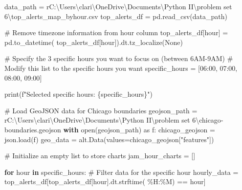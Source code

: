 \documentclass[
  letterpaper,
  DIV=11,
  numbers=noendperiod]{scrartcl}
\newenvironment{Shaded}{\begin{snugshade}}{\end{snugshade}}
\newcommand{\BuiltInTok}[1]{\textcolor[rgb]{0.00,0.23,0.31}{#1}}
\newcommand{\CommentTok}[1]{\textcolor[rgb]{0.37,0.37,0.37}{#1}}
\newcommand{\ControlFlowTok}[1]{\textcolor[rgb]{0.00,0.23,0.31}{\textbf{#1}}}
\newcommand{\ImportTok}[1]{\textcolor[rgb]{0.00,0.46,0.62}{#1}}
\newcommand{\KeywordTok}[1]{\textcolor[rgb]{0.00,0.23,0.31}{\textbf{#1}}}
\newcommand{\NormalTok}[1]{\textcolor[rgb]{0.00,0.23,0.31}{#1}}
\newcommand{\OperatorTok}[1]{\textcolor[rgb]{0.37,0.37,0.37}{#1}}
\newcommand{\SpecialCharTok}[1]{\textcolor[rgb]{0.37,0.37,0.37}{#1}}
\newcommand{\SpecialStringTok}[1]{\textcolor[rgb]{0.13,0.47,0.30}{#1}}
\newcommand{\StringTok}[1]{\textcolor[rgb]{0.13,0.47,0.30}{#1}}
\newcommand{\VariableTok}[1]{\textcolor[rgb]{0.07,0.07,0.07}{#1}}
\newcommand{\VerbatimStringTok}[1]{\textcolor[rgb]{0.13,0.47,0.30}{#1}}
\begin{document}
\begin{Shaded}
\begin{Highlighting}[]
\NormalTok{data\_path }\OperatorTok{=} \VerbatimStringTok{r\textquotesingle{}C:\textbackslash{}Users\textbackslash{}clari\textbackslash{}OneDrive\textbackslash{}Documents\textbackslash{}Python II\textbackslash{}problem set 6\textbackslash{}top\_alerts\_map\_byhour.csv\textquotesingle{}}
\NormalTok{top\_alerts\_df }\OperatorTok{=}\NormalTok{ pd.read\_csv(data\_path)}

\CommentTok{\# Remove timezone information from \textquotesingle{}hour\textquotesingle{} column}
\NormalTok{top\_alerts\_df[}\StringTok{\textquotesingle{}hour\textquotesingle{}}\NormalTok{] }\OperatorTok{=}\NormalTok{ pd.to\_datetime(}
\NormalTok{    top\_alerts\_df[}\StringTok{\textquotesingle{}hour\textquotesingle{}}\NormalTok{]).dt.tz\_localize(}\VariableTok{None}\NormalTok{)}

\CommentTok{\# Specify the 3 specific hours you want to focus on (between 6AM{-}9AM)}
\CommentTok{\# Modify this list to the specific hours you want}
\NormalTok{specific\_hours }\OperatorTok{=}\NormalTok{ [}\StringTok{\textquotesingle{}06:00\textquotesingle{}}\NormalTok{, }\StringTok{\textquotesingle{}07:00\textquotesingle{}}\NormalTok{, }\StringTok{\textquotesingle{}08:00\textquotesingle{}}\NormalTok{, }\StringTok{\textquotesingle{}09:00\textquotesingle{}}\NormalTok{]}

\BuiltInTok{print}\NormalTok{(}\SpecialStringTok{f"Selected specific hours: }\SpecialCharTok{\{}\NormalTok{specific\_hours}\SpecialCharTok{\}}\SpecialStringTok{"}\NormalTok{)}

\CommentTok{\# Load GeoJSON data for Chicago boundaries}
\NormalTok{geojson\_path }\OperatorTok{=} \VerbatimStringTok{r\textquotesingle{}C:\textbackslash{}Users\textbackslash{}clari\textbackslash{}OneDrive\textbackslash{}Documents\textbackslash{}Python II\textbackslash{}problem set 6\textbackslash{}chicago{-}boundaries.geojson\textquotesingle{}}
\ControlFlowTok{with} \BuiltInTok{open}\NormalTok{(geojson\_path) }\ImportTok{as}\NormalTok{ f:}
\NormalTok{    chicago\_geojson }\OperatorTok{=}\NormalTok{ json.load(f)}
\NormalTok{geo\_data }\OperatorTok{=}\NormalTok{ alt.Data(values}\OperatorTok{=}\NormalTok{chicago\_geojson[}\StringTok{"features"}\NormalTok{])}

\CommentTok{\# Initialize an empty list to store charts}
\NormalTok{jam\_hour\_charts }\OperatorTok{=}\NormalTok{ []}

\ControlFlowTok{for}\NormalTok{ hour }\KeywordTok{in}\NormalTok{ specific\_hours:}
    \CommentTok{\# Filter data for the specific hour}
\NormalTok{    hourly\_data }\OperatorTok{=}\NormalTok{ top\_alerts\_df[top\_alerts\_df[}\StringTok{\textquotesingle{}hour\textquotesingle{}}\NormalTok{].dt.strftime(}
        \StringTok{\textquotesingle{}\%H:\%M\textquotesingle{}}\NormalTok{) }\OperatorTok{==}\NormalTok{ hour]}


\end{Highlighting}
\end{Shaded}
\end{document}
